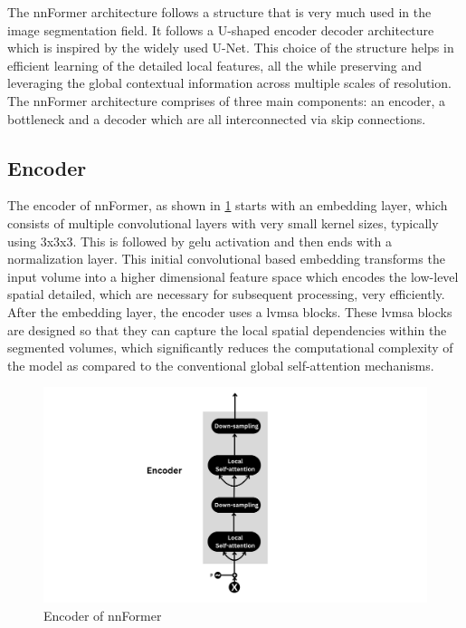 The nnFormer architecture follows a structure that is very much used in the image segmentation field. It follows a U-shaped encoder decoder architecture which is inspired by the widely used U-Net. This choice of the structure helps in efficient learning of the detailed local features, all the while preserving and leveraging the global contextual information across multiple scales of resolution. The nnFormer architecture comprises of three main components: an encoder, a bottleneck and a decoder which are all interconnected via skip connections.

\subsection{Encoder}
The encoder of nnFormer, as shown in \cref{Fig:encoder} starts with an embedding layer, which consists of multiple convolutional layers with very small kernel sizes, typically using 3x3x3. This is followed by \gls{gelu} activation and then ends with a normalization layer. This initial convolutional based embedding transforms the input volume into a higher dimensional feature space which encodes the low-level spatial detailed, which are necessary for subsequent processing, very efficiently. After the embedding layer, the encoder uses a \gls{lvmsa} blocks. These \gls{lvmsa} blocks are designed so that they can capture the local spatial dependencies within the segmented volumes, which significantly reduces the computational complexity of the model as compared to the conventional global self-attention mechanisms. 

\begin{figure}[htb!] %
\centering
\centering
\includegraphics[width=1\textwidth]{images/Encoder.png}
\caption{\centering Encoder of nnFormer}
\label{Fig:encoder}
\end{figure}

